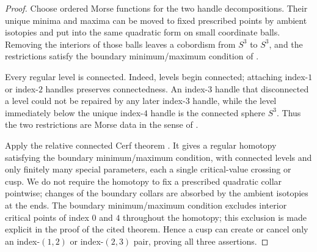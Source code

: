 \begin{proof}
Choose ordered Morse functions for the two handle decompositions.  Their
unique minima and maxima can be moved to fixed prescribed points by ambient
isotopies and put into the same quadratic form on small coordinate balls.
Removing the interiors of those balls leaves a cobordism from $S^3$ to
$S^3$, and the restrictions satisfy the boundary minimum/maximum condition
of \cite[Definition~2.1(i)]{GayWehrheimWoodward2012}.

Every regular level is connected.  Indeed, levels begin connected; attaching
index-$1$ or index-$2$ handles preserves connectedness.  An index-$3$ handle
that disconnected a level could not be repaired by any later index-$3$
handle, while the level immediately below the unique index-$4$ handle is the
connected sphere $S^3$.  Thus the two restrictions are Morse data in the
sense of \cite[Definition~2.1]{GayWehrheimWoodward2012}.

Apply the relative connected Cerf theorem
\cite[Theorem~3.6]{GayWehrheimWoodward2012}.  It gives a regular homotopy
satisfying the boundary minimum/maximum condition, with connected levels and
only finitely many special parameters, each a single critical-value crossing
or cusp.  We do not require the homotopy to fix a prescribed quadratic
collar pointwise; changes of the boundary collars are absorbed by the
ambient isotopies at the ends.  The
boundary minimum/maximum condition excludes interior critical points of
index $0$ and $4$ throughout the homotopy; this exclusion is made explicit
in the proof of the cited theorem.  Hence a cusp can create or cancel only an
index-$(1,2)$ or index-$(2,3)$ pair, proving all three assertions.
\end{proof}

